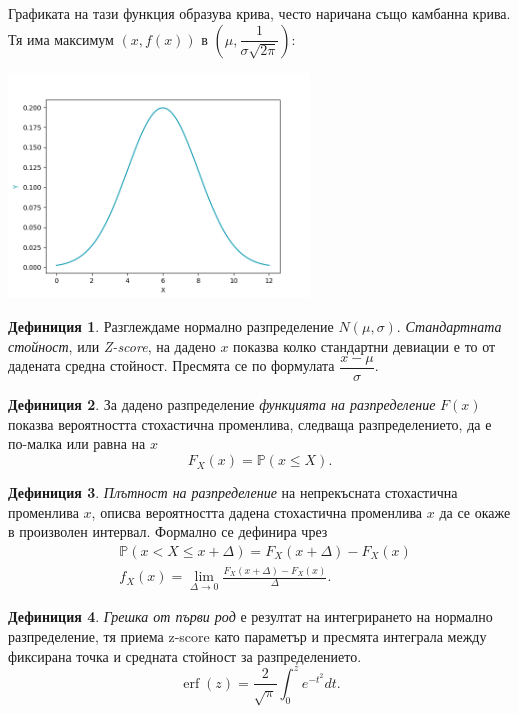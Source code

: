\documentclass[11pt, a4paper]{article}
\theoremstyle{definition}
\newtheorem{definition}{Дефиниция}
\begin{document}
		Графиката на тази функция образува крива, често наричана също камбанна крива. Тя има максимум $(x,f(x))$ в $\left(\mu, \dfrac{1}{\sigma\sqrt{2\pi}}\right)$:
		\begin{center}
			\includegraphics[width=0.6\textwidth]{Normal_clean}
		\end{center}
		
		\begin{definition}
			\label{def:def2}
			Разглеждаме нормално разпределение $N(\mu, \sigma)$. \emph{Стандартната стойност}, или \emph{Z-score}, на дадено $x$ показва колко стандартни девиации е то от дадената средна стойност. Пресмята се по формулата $\dfrac{x-\mu}{\sigma}$.
		\end{definition}
	
		\begin{definition}
			\label{def:prob_dist}
			За дадено разпределение \emph{функцията на разпределение} $F(x)$ показва вероятността стохастична променлива, следваща разпределението, да е по-малка или равна на $x$
			$$F_{X}(x)=\mathbb{P}(x\leq X).$$
		\end{definition}
	
		\begin{definition}
			\label{def:prob_dens}
			\emph{Плътност на разпределение} на непрекъсната стохастична променлива $x$, описва вероятността дадена стохастична променлива $x$ да се окаже в произволен интервал. Формално се дефинира чрез
			\begin{align*}
				&\mathbb{P}(x < X \leq x+\Delta)=F_X(x+\Delta)-F_X(x)\\
				&f_X(x)=\lim_{\Delta \rightarrow 0} \frac{F_X(x+\Delta)-F_X(x)}{\Delta}.		
			\end{align*}
		\end{definition}
	
		\begin{definition}
			\label{def:err}
			\emph{Грешка от първи род} е резултат на интегрирането на нормално разпределение, тя приема z-score като параметър и пресмята интеграла между фиксирана точка и средната стойност за разпределението.
			$$\operatorname{erf}(z)=\dfrac{2}{\sqrt{\pi}}\int_{0}^{z}e^{-t^{2}}dt.$$
		\end{definition}
	
\end{document}
